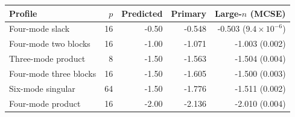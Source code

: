 \begin{tabular}{lrrrr}
\toprule
Profile & $p$ & Predicted & Primary & Large-$n$ (MCSE) \\
\midrule
Four-mode slack & 16 & -0.50 & -0.548 & -0.503 ($9.4\times10^{-6}$) \\
Four-mode two blocks & 16 & -1.00 & -1.071 & -1.003 (0.002) \\
Three-mode product & 8 & -1.50 & -1.563 & -1.504 (0.004) \\
Four-mode three blocks & 16 & -1.50 & -1.605 & -1.500 (0.003) \\
Six-mode singular & 64 & -1.50 & -1.776 & -1.511 (0.002) \\
Four-mode product & 16 & -2.00 & -2.136 & -2.010 (0.004) \\
\bottomrule
\end{tabular}
